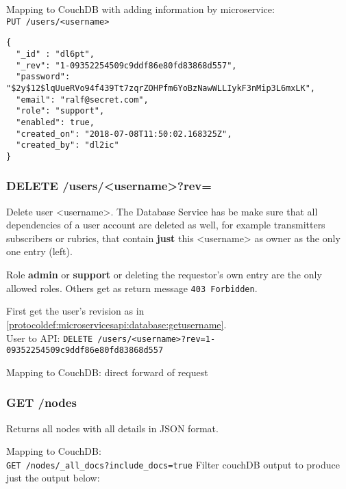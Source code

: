 Mapping to CouchDB with adding information by microservice:\\
\verb|PUT /users/<username>|
\begin{lstlisting}
{
  "_id" : "dl6pt",
  "_rev": "1-09352254509c9ddf86e80fd83868d557",
  "password": "$2y$12$lqUueRVo94f439Tt7zqrZOHPfm6YoBzNawWLLIykF3nMip3L6mxLK",
  "email": "ralf@secret.com",
  "role": "support",
  "enabled": true,
  "created_on": "2018-07-08T11:50:02.168325Z",
  "created_by": "dl2ic"
}
\end{lstlisting}

\subsubsection{DELETE /users/<username>?rev=}
Delete user <username>. The Database Service has be make sure that all dependencies of a user account are deleted as well, for example transmitters subscribers or rubrics, that contain \textbf{just} this <username> as owner as the only one entry (left).

Role \textbf{admin} or \textbf{support} or deleting the requestor's own entry are the only allowed roles. Others get as return message \verb|403 Forbidden|.

First get the user's revision as in \ref{protocoldef:microservicesapi:database:getusername}.\\
User to API: \verb|DELETE /users/<username>?rev=1-09352254509c9ddf86e80fd83868d557|

Mapping to CouchDB: direct forward of request


\subsubsection{GET /nodes}
\label{protocoldef:microservicesapi:database:getnodes}
Returns all nodes with all details in JSON format.

Mapping to CouchDB:\\
\verb|GET /nodes/_all_docs?include_docs=true|
Filter couchDB output to produce just the output below:

